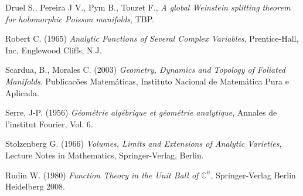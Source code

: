 \documentclass[letterpaper]{report}
\newcommand{\con}{\ensuremath{\mathbb{C}^n}}
\begin{document}
\begin{thebibliography}{3}
Druel S., Pereira J V., Pym B., Touzet F., \textit{A global Weinstein splitting theorem for 
holomorphic Poisson manifolds}, TBP.

 Robert C. (1965) \textit{Analytic Functions of Several
Complex Variables}, Prentice-Hall, Inc, Englewood Cliffs, N.J.

 Scardua, B., Morales C. (2003) \textit{Geometry, Dynamics
and Topology of Foliated Manifolds}. Publicac\~oes Matem\'aticas, Instituto
Nacional de Matem\'atica Pura e Aplicada.

 Serre, J-P. (1956) \textit{G\'eom\'etrie alg\'ebrique et
g\'eom\'etrie analytique}, Annales de l'institut Fourier, Vol. 6. 

 Stolzenberg G. (1966) \textit{Volumes, Limits and
Extensions of Analytic Varieties}, Lecture Notes in Mathematics,
Springer-Verlag, Berlin. 

 Rudin W. (1980) \textit{Function Theory in the Unit Ball of
$\con$}, Springer-Verlag Berlin Heidelberg 2008.

\end{thebibliography}
\end{document}
